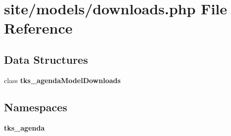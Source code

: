 \section{site/models/downloads.php File Reference}
\label{site_2models_2downloads_8php}
\subsection*{Data Structures}
\begin{DoxyCompactItemize}
\item 
class \textbf{ tks\+\_\+agenda\+Model\+Downloads}
\end{DoxyCompactItemize}
\subsection*{Namespaces}
\begin{DoxyCompactItemize}
\item 
 \textbf{ tks\+\_\+agenda}
\end{DoxyCompactItemize}
